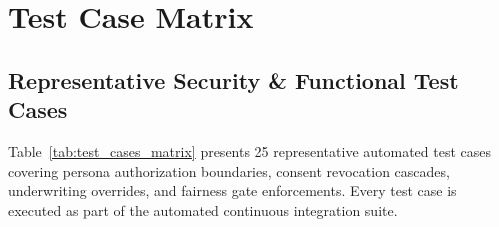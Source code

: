 \chapter{Test Case Matrix}
\label{chap:test_case_matrix}

\section{Representative Security \& Functional Test Cases}
Table~\ref{tab:test_cases_matrix} presents 25 representative automated test cases covering persona authorization boundaries, consent revocation cascades, underwriting overrides, and fairness gate enforcements. Every test case is executed as part of the automated continuous integration suite.

